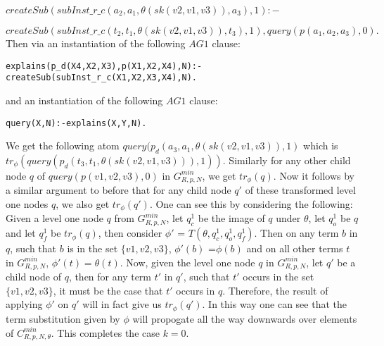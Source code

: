 $createSub(subInst\_r\_c(a_{2},a_{1},\theta(sk(v2,v1,v3)),a_{3}),1):-$  

$createSub(subInst\_r\_c(t_{2},t_{1},\theta(sk(v2,v1,v3)),t_{3}),1),query(p(a_{1},a_{2},a_{3}),0).$\\
Then via an instantiation of the following $AG1$ clause:
\begin{lstlisting}[frame=none]
explains(p_d(X4,X2,X3),p(X1,X2,X4),N):-
createSub(subInst_r_c(X1,X2,X3,X4),N).    
\end{lstlisting}
and an instantiation of the following $AG1$ clause:
\begin{lstlisting}[frame=none]
query(X,N):-explains(X,Y,N). 
\end{lstlisting}
   

We get the following atom $query(p_{d}(a_{3},a_{1},\theta(sk(v2,v1,v3)),1)$ which is $tr_{\phi}(query(p_{d}(t_{3},t_{1},\theta(sk(v2,v1,v3))),1))$. Similarly for any other child node $q$ of $query(p(v1,v2,v3),0)$ in $G_{R,p,N}^{min}$, we get $tr_{\phi}(q)$. Now it follows by a similar argument to before that for any child node $q'$ of these transformed level one nodes $q$, we also get $tr_{\phi}(q')$. One can see this by considering the following: Given a level one node $q$ from $G_{R,p,N}^{min}$, let $q_{c}^{1}$ be the image of $q$ under $\theta$, let $q_{o}^{1}$ be $q$ and let $q_{f}^{1}$ be $tr_{\phi}(q)$, then consider $\phi'$ = $T(\theta, q_{c}^{1},q_{o}^{1},q_{f}^{1})$. Then on any term $b$ in $q$, such that $b$ is in the set $\{v1,v2,v3\}$, $\phi'(b)$ =$\phi(b)$ and on all other terms $t$ in $G_{R,p,N}^{min}$, $\phi'(t)=\theta(t)$. Now, given the level one node $q$ in $G_{R,p,N}^{min}$, let $q'$ be a child node of $q$, then for any term $t'$ in $q'$, such that $t'$ occurs in the set $\{v1,v2,v3\}$, it must be the case that $t'$ occurs in $q$. Therefore, the result of applying $\phi'$ on $q'$ will in fact give us $tr_{\phi}(q')$. In this way one can see that the term substitution given by $\phi$ will propogate all the way downwards over elements of $C_{R,p,N,\theta}^{min}$. This completes the case $k=0$. 

